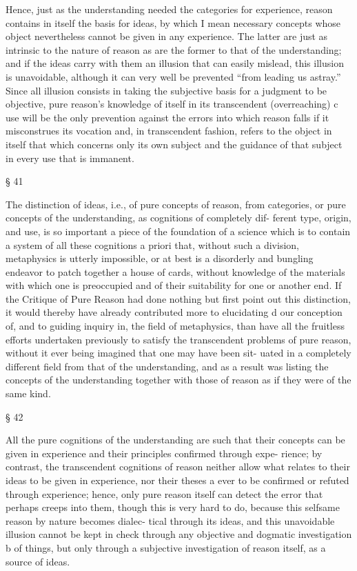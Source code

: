 Hence, just as the understanding needed the categories for experience,
reason contains in itself the basis for ideas, by which I mean necessary
concepts whose object nevertheless cannot be given in any experience.
The latter are just as intrinsic to the nature of reason as are the former
to that of the understanding; and if the ideas carry with them an illusion
that can easily mislead, this illusion is unavoidable, although it can very
well be prevented “from leading us astray.”
Since all illusion consists in taking the subjective basis for a judgment
to be objective, pure reason’s knowledge of itself in its transcendent
(overreaching) c use will be the only prevention against the errors into
which reason falls if it misconstrues its vocation and, in transcendent
fashion, refers to the object in itself that which concerns only its own
subject and the guidance of that subject in every use that is immanent.

§ 41

The distinction of ideas, i.e., of pure concepts of reason, from categories,
or pure concepts of the understanding, as cognitions of completely dif-
ferent type, origin, and use, is so important a piece of the foundation of
a science which is to contain a system of all these cognitions a priori that,
without such a division, metaphysics is utterly impossible, or at best is
a disorderly and bungling endeavor to patch together a house of cards,
without knowledge of the materials with which one is preoccupied and
of their suitability for one or another end. If the Critique of Pure Reason
had done nothing but ﬁrst point out this distinction, it would thereby
have already contributed more to elucidating d our conception of, and to
guiding inquiry in, the ﬁeld of metaphysics, than have all the fruitless
efforts undertaken previously to satisfy the transcendent problems of
pure reason, without it ever being imagined that one may have been sit-
uated in a completely different ﬁeld from that of the understanding, and
as a result was listing the concepts of the understanding together with
those of reason as if they were of the same kind.

§ 42

All the pure cognitions of the understanding are such that their concepts
can be given in experience and their principles conﬁrmed through expe-
rience; by contrast, the transcendent cognitions of reason neither allow
what relates to their ideas to be given in experience, nor their theses a ever
to be conﬁrmed or refuted through experience; hence, only pure reason
itself can detect the error that perhaps creeps into them, though this is
very hard to do, because this selfsame reason by nature becomes dialec-
tical through its ideas, and this unavoidable illusion cannot be kept in
check through any objective and dogmatic investigation b of things, but
only through a subjective investigation of reason itself, as a source of
ideas.

